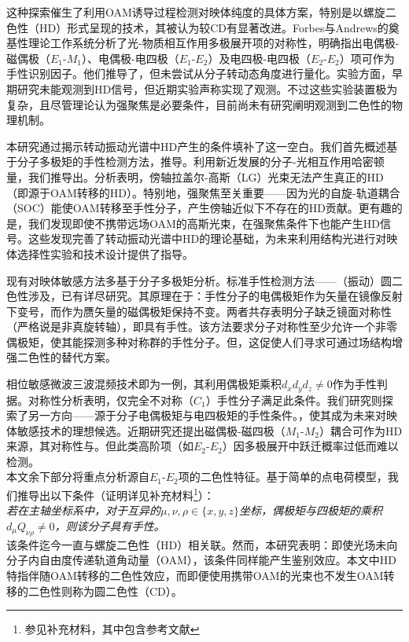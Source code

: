 \documentclass[reprint,aps,prl,twocolumn,superscriptaddress,groupedaddress]{revtex4-2}
\newcommand{\eomo}{$E_1$-$M_1$}
\newcommand{\eoet}{$E_1$-$E_2$}
\newcommand{\etet}{$E_2$-$E_2$}
\begin{document}
\begin{CJK*}{UTF8}{gbsn}
这种探索催生了利用OAM诱导过程检测对映体纯度的具体方案，特别是以螺旋二色性（HD）\cite{ANDREWS2004,Ye2019,Li2021}形式呈现的技术，其被认为较CD有显著改进\cite{Ye2019,Li2021}。Forbes与Andrews的奠基性理论工作\cite{Forbes2018,Forbes2019,Forbes2021}系统分析了光-物质相互作用多极展开项的对称性，明确指出电偶极-磁偶极（\eomo）、电偶极-电四极（\eoet）及电四极-电四极（\etet）项可作为手性识别因子。他们推导了，但未尝试从分子转动态角度进行量化。实验方面，早期研究未能观测到HD信号\cite{Araoka2005,Loeffler2011}，但近期实验声称实现了观测\cite{Rusak2019,Zhang2020,Rouxel2022,Begin2023,Jain2023}。不过这些实验装置极为复杂，且尽管理论认为强聚焦是必要条件\cite{Forbes2019}，目前尚未有研究阐明观测到二色性的物理机制。

本研究通过揭示转动振动光谱中HD产生的条件填补了这一空白。我们首先概述基于分子多极矩的手性检测方法，推导。利用新近发展的分子-光相互作用哈密顿量\cite{Maslov2024,Maslov_Thesis}，我们推导出。分析表明，傍轴拉盖尔-高斯（LG）光束无法产生真正的HD（即源于OAM转移的HD）。特别地，强聚焦至关重要——因为光的自旋-轨道耦合（SOC）\cite{Bliokh2015}能使OAM转移至手性分子，产生傍轴近似下不存在的HD贡献。更有趣的是，我们发现即使不携带远场OAM的高斯光束，在强聚焦条件下也能产生HD信号。这些发现完善了转动振动光谱中HD的理论基础，为未来利用结构光进行对映体选择性实验和技术设计提供了指导。

现有对映体敏感方法多基于分子多极矩分析。标准手性检测方法——（振动）圆二色性涉及，已有详尽研究\cite{Stephens1985,BUCKINGHAM1987,Mun2019,Lovesey2019}。其原理在于：手性分子的电偶极矩作为矢量在镜像反射下变号，而作为赝矢量的磁偶极矩保持不变。两者共存表明分子缺乏镜面对称性（严格说是非真旋转轴），即具有手性。该方法要求分子对称性至少允许一个非零偶极矩，使其能探测多种对称群的手性分子。但，这促使人们寻求可通过场结构增强二色性的替代方案。

相位敏感微波三波混频技术\cite{Patterson2013,Patterson2013PRL}即为一例，其利用偶极矩乘积$d_xd_yd_z\neq 0$作为手性判据\cite{Patterson2013,Ordonez2018,Ayuso2022}。对称性分析表明，仅完全不对称（$C_1$）手性分子满足此条件。我们研究则探索了另一方向——源于分子电偶极矩与电四极矩的手性条件。，使其成为未来对映体敏感技术的理想候选。近期研究还提出磁偶极-磁四极（$M_1$-$M_2$）耦合可作为HD来源，其对称性与\cite{Ji2024}。但此类高阶项（如\etet）因多极展开中跃迁概率过低而难以检测。\\
本文余下部分将重点分析源自\eoet 项的二色性特征。基于简单的点电荷模型，我们推导出以下条件（证明详见补充材料\footnote{参见补充材料，其中包含参考文献\cite{Maslov2024,Maslov_Thesis,Lax1975,Bliokh2015,Bliokh2023}}）：\\
\textit{若在主轴坐标系中，对于互异的$\mu, \nu, \rho \in \{x,y,z\}$坐标，偶极矩与四极矩的乘积$d_{\mu}Q_{\nu \rho} \neq 0$，则该分子具有手性。}\\
该条件迄今一直与螺旋二色性（HD）相关联\cite{ANDREWS2004,Forbes2018}。然而，本研究表明：即使光场未向分子内自由度传递轨道角动量（OAM），该条件同样能产生鉴别效应。本文中HD特指伴随OAM转移的二色性效应，而即便使用携带OAM的光束也不发生OAM转移的二色性则称为圆二色性（CD）。


\end{CJK*}
\end{document}
